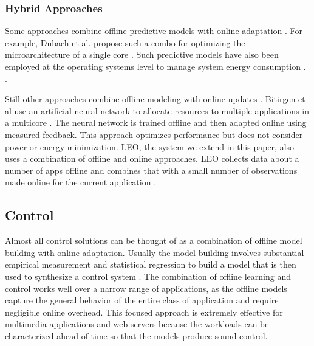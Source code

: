 \subsubsection{Hybrid Approaches}
Some approaches combine offline predictive models with online
adaptation
\cite{Zhang2012,packandcap,Winter2010,dubach2010,Koala,Cinder,
  wu2012inferred}.  For example, Dubach et al.  propose such a combo
for optimizing the microarchitecture of a single core
\cite{dubach2010}.  Such predictive models have also been employed at
the operating systems level to manage system energy consumption \cite{Koala,Cinder}.
\cite{wu2012inferred}.


Still other approaches combine offline modeling with online
updates \cite{JouleGuard,Bitirgen2008,Ipek}.  Bitirgen et
al use an artificial neural network to allocate resources to multiple
applications in a multicore \cite{Bitirgen2008}.  The neural network
is trained offline and then adapted online using measured feedback.
This approach optimizes performance but does not consider power or
energy minimization.  LEO, the system we extend in this paper, also
uses a combination of offline and online approaches.  LEO collects
data about a number of apps offline and combines that with a
small number of observations made online for the current application
\cite{LEO}.

\subsection{Control}
Almost all control solutions can be thought of as a combination of
offline model building with online adaptation.  Usually the model
building involves substantial empirical measurement and statistical
regression to build a model that is then used to synthesize a control
system
\cite{Wu2004,TCST,Chen2011,PTRADE,POET,ControlWare,Agilos,Rajkumar,Sojka,Raghavendra2008}.
The combination of offline
learning and control works well over a narrow range of applications, as the offline models capture the
general behavior of the entire class of application and require
negligible online overhead.  This focused approach is extremely
effective for multimedia applications
\cite{grace2,flinn99,flinn2004,xtune,TCST} and web-servers
\cite{Horvarth,LuEtAl-2006a,SunDaiPan-2008a} because the workloads can
be characterized ahead of time so that the models produce sound
control.

